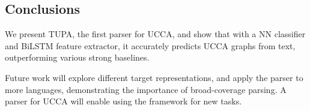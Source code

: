 \documentclass[a0,portrait]{a0poster}
\begin{document}
\begin{multicols}{2}
\section*{Conclusions}

We present TUPA{}, the first parser for UCCA, and show that with a
NN classifier and BiLSTM feature extractor,
it accurately predicts UCCA graphs from text, outperforming various
strong baselines.

Future work will explore different target representations,
and apply the parser to more languages,
demonstrating the importance of broad-coverage parsing.
A parser for UCCA will enable using the framework for new tasks.


\color{DarkSlateGray} %
\tiny


\end{multicols}
\end{document}
